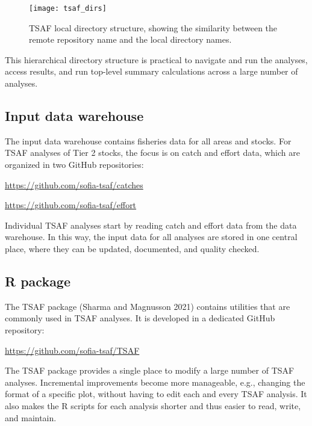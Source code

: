 \documentclass[12pt]{article}
\newcommand\blue[1]{\textcolor{darkblue}{#1}}
\begin{document}
\begin{figure}[htb]
  \begin{center}
    \texttt{[image: tsaf\_dirs]}
    \vspace{1ex}
    \caption{TSAF local directory structure, showing the similarity between the
      remote repository name and the local directory names.}
    \label{fig:tsaf-dirs}
  \end{center}
\end{figure}

\vspace{1ex}

This hierarchical directory structure is practical to navigate and run the
analyses, access results, and run top-level summary calculations across a large
number of analyses.

\subsection{Input data warehouse}

The input data warehouse contains fisheries data for all areas and stocks. For
TSAF analyses of Tier 2 stocks, the focus is on catch and effort data, which are
organized in two GitHub repositories:

\qquad\blue{\url{https://github.com/sofia-tsaf/catches}}

\qquad\blue{\url{https://github.com/sofia-tsaf/effort}}

Individual TSAF analyses start by reading catch and effort data from the data
warehouse. In this way, the input data for all analyses are stored in one
central place, where they can be updated, documented, and quality checked.

\subsection{R package}

The {\sf TSAF} package (Sharma and Magnusson 2021) contains utilities that are
commonly used in TSAF analyses. It is developed in a dedicated GitHub
repository:

\qquad\blue{\url{https://github.com/sofia-tsaf/TSAF}}

The {\sf TSAF} package provides a single place to modify a large number of TSAF
analyses. Incremental improvements become more manageable, e.g., changing the
format of a specific plot, without having to edit each and every TSAF analysis.
It also makes the R scripts for each analysis shorter and thus easier to read,
write, and maintain.
\end{document}
